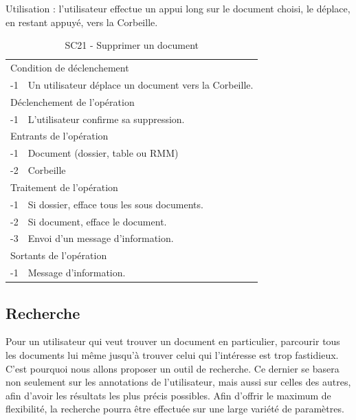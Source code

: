 \documentclass[a4paper]{article}
\begin{document}
Utilisation : l'utilisateur effectue un appui long sur le document choisi, le déplace, en restant appuyé, vers la Corbeille.

\begin{table}[H]
  \centering
   \small
	\begin{tabular}{|c|p{12cm}|}
   		\hline
   			\rowcolor{lightgray}\multicolumn{2}{|c|}{\textbf{SC21 - Supprimer un document}} \\
   		\hline
   			\multicolumn{2}{|l|}{Condition de d\'eclenchement} \\
   		\hline
   			-1 & Un utilisateur déplace un document vers la Corbeille.\\
   		\hline
   			\multicolumn{2}{|l|}{D\'eclenchement de l'op\'eration} \\
   		\hline
   			-1 & L'utilisateur confirme sa suppression.\\
   		\hline
   			\multicolumn{2}{|l|}{Entrants de l'op\'eration} \\
   		\hline
   			-1 & Document (dossier, table ou RMM)\\
        		-2 & Corbeille\\
   		\hline
   			\multicolumn{2}{|l|}{Traitement de l'op\'eration} \\
  		\hline
   			-1 & Si dossier, efface tous les sous documents. \\
			-2 & Si document, efface le document. \\
			-3 & Envoi d'un message d'information. \\		
		\hline
   			\multicolumn{2}{|l|}{Sortants de l'op\'eration} \\
   		\hline
   			-1 & Message d'information. \\
   		\hline
	\end{tabular}
  \caption{SC21 - Supprimer un document}
  \normalsize
  \label{tab:supprimer_document}
\end{table}

\subsection{Recherche}

Pour un utilisateur qui veut trouver un document en particulier, parcourir tous les documents lui même jusqu'à trouver celui qui l'intéresse est trop fastidieux.
C'est pourquoi nous allons proposer un outil de recherche.
Ce dernier se basera non seulement sur les annotations de l'utilisateur, mais aussi sur celles des autres, afin d'avoir les résultats les plus précis possibles.
Afin d'offrir le maximum de flexibilité, la recherche pourra être effectuée sur une large variété de paramètres.
\end{document}
